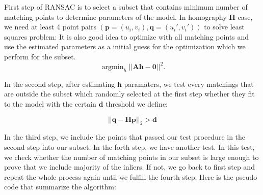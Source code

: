 \documentclass[a4paper]{report}
\numberwithin{figure}{section}
\newcommand{\argmin}{\mathop{\mathrm{argmin}}}
\begin{document}
First step of RANSAC is to select a subset that contains 
minimum number of matching points to 
determine parameters of the model. In homography $\mathbf{H}$ case, we need at least 
4 point pairs $(\mathbf{p}=(u_i,v_i),\mathbf{q}=(u_i',v_i'))$ to solve least squares problem:
It is also good idea to optimize with all matching points and use 
the estimated parameters as a initial guess for the optimization 
which we perform for the subset.
\begin{equation}
\argmin_h || \mathbf{Ah-0}||^2.
\end{equation}

In the second step, 
after estimating $\mathbf{h}$ paramaters, we test every matchings that are 
outside the subset which randomly selected at the first step whether 
they fit to the model with the certain $\mathbf{d}$ threshold we define:

\begin{equation}
  ||\mathbf{q} - \mathbf{H}\mathbf{p}||_2 > \mathbf{d} 
\end{equation}

In the third step, we include the points 
that passed our test procedure in the second step into our subset. In the 
forth step, we have another test. In this test, we check whether the number of 
matching points in our subset is large enough to prove that we include 
majority of the inliers. If not, we go back to first step and repeat the 
whole process again until we fulfill the fourth step. Here is the pseudo code 
that summarize the algorithm:
\end{document}
